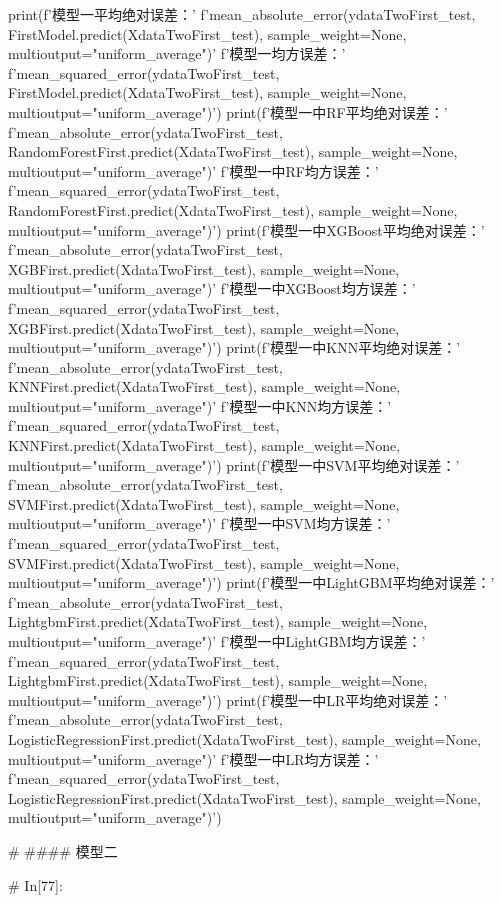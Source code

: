 \documentclass{MathorCupmodeling}
\begin{document}
\begin{python}
print(f'模型一平均绝对误差：'
      f'{mean_absolute_error(ydataTwoFirst_test, FirstModel.predict(XdataTwoFirst_test), sample_weight=None, multioutput="uniform_average")}\n'
      f'模型一均方误差：'
      f'{mean_squared_error(ydataTwoFirst_test, FirstModel.predict(XdataTwoFirst_test), sample_weight=None, multioutput="uniform_average")}')
print(f'模型一中RF平均绝对误差：'
      f'{mean_absolute_error(ydataTwoFirst_test, RandomForestFirst.predict(XdataTwoFirst_test), sample_weight=None, multioutput="uniform_average")}\n'
      f'模型一中RF均方误差：'
      f'{mean_squared_error(ydataTwoFirst_test, RandomForestFirst.predict(XdataTwoFirst_test), sample_weight=None, multioutput="uniform_average")}')
print(f'模型一中XGBoost平均绝对误差：'
      f'{mean_absolute_error(ydataTwoFirst_test, XGBFirst.predict(XdataTwoFirst_test), sample_weight=None, multioutput="uniform_average")}\n'
      f'模型一中XGBoost均方误差：'
      f'{mean_squared_error(ydataTwoFirst_test, XGBFirst.predict(XdataTwoFirst_test), sample_weight=None, multioutput="uniform_average")}')
print(f'模型一中KNN平均绝对误差：'
      f'{mean_absolute_error(ydataTwoFirst_test, KNNFirst.predict(XdataTwoFirst_test), sample_weight=None, multioutput="uniform_average")}\n'
      f'模型一中KNN均方误差：'
      f'{mean_squared_error(ydataTwoFirst_test, KNNFirst.predict(XdataTwoFirst_test), sample_weight=None, multioutput="uniform_average")}')
print(f'模型一中SVM平均绝对误差：'
      f'{mean_absolute_error(ydataTwoFirst_test, SVMFirst.predict(XdataTwoFirst_test), sample_weight=None, multioutput="uniform_average")}\n'
      f'模型一中SVM均方误差：'
      f'{mean_squared_error(ydataTwoFirst_test, SVMFirst.predict(XdataTwoFirst_test), sample_weight=None, multioutput="uniform_average")}')
print(f'模型一中LightGBM平均绝对误差：'
      f'{mean_absolute_error(ydataTwoFirst_test, LightgbmFirst.predict(XdataTwoFirst_test), sample_weight=None, multioutput="uniform_average")}\n'
      f'模型一中LightGBM均方误差：'
      f'{mean_squared_error(ydataTwoFirst_test, LightgbmFirst.predict(XdataTwoFirst_test), sample_weight=None, multioutput="uniform_average")}')
print(f'模型一中LR平均绝对误差：'
      f'{mean_absolute_error(ydataTwoFirst_test, LogisticRegressionFirst.predict(XdataTwoFirst_test), sample_weight=None, multioutput="uniform_average")}\n'
      f'模型一中LR均方误差：'
      f'{mean_squared_error(ydataTwoFirst_test, LogisticRegressionFirst.predict(XdataTwoFirst_test), sample_weight=None, multioutput="uniform_average")}')


# #### 模型二

# In[77]:



\end{python}
\end{document}
